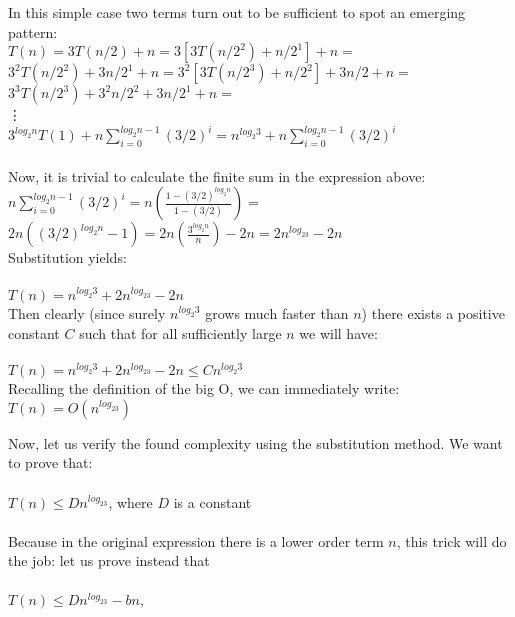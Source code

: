 \documentclass[a4paper]{article}
\begin{document}
\begin{itemize}
In this simple case two terms turn out to be sufficient to spot an emerging pattern: \\
$T(n) = 3T(n/2) + n = 3[3T(n/2^2) + n/2^1] + n = $\\
$3^2T(n/2^2) + 3n/2^1 + n = 3^2[3T(n/2^3)+n/2^2] + 3n/2 + n = $\\
$3^3T(n/2^3) + 3^2n/2^2 + 3n/2^1 + n = $ \\
  \vdots \\
$3^{log_2n}T(1) + n\sum \limits_{i=0}^{log_2{n}-1} (3/2)^i =  n^{log_2{3}} + n\sum \limits_{i=0}^{log_2{n}-1} (3/2)^i $ \\
\\
Now, it is trivial to calculate the finite sum in the expression above: \\
$n\sum \limits_{i=0}^{log_2{n}-1} (3/2)^i = n(\frac{1 - (3/2)^{log_2n}}{1 - (3/2)}) = $\\
$2n((3/2)^{log_2n}-1) = 2n(\frac{3^{log_2n}}{n}) - 2n = 2n^{log_23} - 2n$ \\
Substitution yields: \\ \\
$T(n) = n^{log_2{3}} + 2n^{log_23} - 2n$ \\

Then clearly (since surely $n^{log_2{3}}$ grows much faster than $n$) there exists a positive constant $C$ such that for all sufficiently large $n$ we will have: \\
\\
$T(n) = n^{log_2{3}} + 2n^{log_23} - 2n \leq Cn^{log_2{3}}  $
\\
Recalling the definition of the big O, we can immediately write: \\
$T(n) = O(n^{log_23})$

Now, let us verify the found complexity using the substitution method. We want to prove that: \\ \\
$T(n) \leq Dn^{log_23}$, where $D$ is a constant\\ \\
Because in the original expression there is a lower order term $n$, this trick will do the job:  let us prove instead that \\ \\
$T(n) \leq Dn^{log_23} - bn$, \\ 


\end{itemize}
\end{document}
